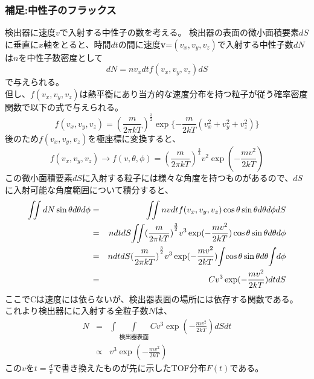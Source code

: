 \subsubsection{補足:中性子のフラックス}
検出器に速度$v$で入射する中性子の数を考える。
検出器の表面の微小面積要素$dS$に垂直に$x$軸をとると、時間$dt$の間に速度{\bf v}=$(v_x,v_y,v_z)$で入射する中性子数$dN$は$n$を中性子数密度として
\begin{equation}
dN=nv_xdtf(v_x,v_y,v_z)dS
\end{equation}
で与えられる。\\
但し、$f(v_x,v_y,v_z)$は熱平衡にあり当方的な速度分布を持つ粒子が従う確率密度関数で以下の式で与えられる。
\begin{equation}
f(v_x,v_y,v_z)={(\frac{m}{2\pi kT})}^{\frac{3}{2}}\exp\{-\frac{m}{2kT}(v^2_x+v^2_y+v^2_z)\} 
\end{equation}
後のため$f(v_x,v_y,v_z)$を極座標に変換すると、
\begin{equation}
f(v_x,v_y,v_z) \rightarrow f(v,\theta,\phi)={(\frac{m}{2\pi kT})}^{\frac{3}{2}}v^2\exp(-\frac{mv^2}{2kT})
\end{equation}
この微小面積要素$dS$に入射する粒子には様々な角度を持つものがあるので、$dS$に入射可能な角度範囲について積分すると、
\begin{eqnarray*}
 \iint dN\sin\theta d\theta d\phi &=&\iint nvdtf(v_x,v_y,v_z)\cos\theta \sin\theta d\theta d\phi dS \\ 
&=&ndtdS \hspace{-2pt}\iint \hspace{-2pt}{(\frac{m}{2\pi kT})}^{\frac{3}{2}}v^3\exp(-\frac{mv^2}{2kT})\cos\theta \sin\theta d\theta d\phi  \\
&=&ndtdS{(\frac{m}{2\pi kT})}^{\frac{3}{2}} v^3\exp(-\frac{mv^2}{2kT}) \hspace{-2pt}\int \hspace{-2pt}\cos\theta\sin\theta d\theta \hspace{-2pt}\int \hspace{-2pt} d\phi \\
&=&Cv^3\exp(-\frac{mv^2}{2kT})dtdS
\end{eqnarray*}
ここでCは速度には依らないが、検出器表面の場所には依存する関数である。\\
これより検出器にに入射する全粒子数$N$は、
\begin{eqnarray*}
N &=&
\int\int\limits_{\text{} 検出器表面}Cv^3\exp(-\frac{mv^2}{2kT})dSdt \\
&\propto& v^3\exp(-\frac{mv^2}{2kT})
\end{eqnarray*}
この$v$を$t=\frac{d}{v}$で書き換えたものが先に示したTOF分布$F(t)$である。
\newpage
